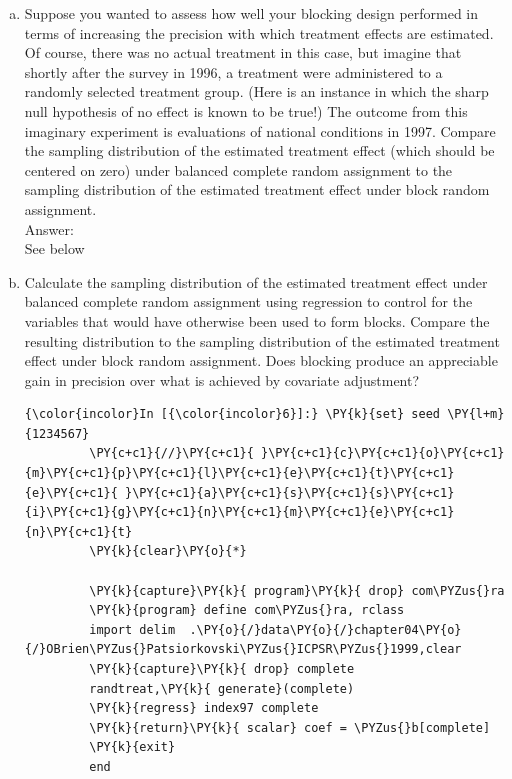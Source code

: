 \documentclass[11pt,notitlepage]{article}\usepackage[]{graphicx}\usepackage[]{color}
\makeatletter
\newenvironment{kframe}{%
 \def\at@end@of@kframe{}%
 \ifinner\ifhmode%
  \def\at@end@of@kframe{\end{minipage}}%
  \begin{minipage}{\columnwidth}%
 \fi\fi%
 \def\FrameCommand##1{\hskip\@totalleftmargin \hskip-\fboxsep
 \colorbox{shadecolor}{##1}\hskip-\fboxsep
     \hskip-\linewidth \hskip-\@totalleftmargin \hskip\columnwidth}%
 \MakeFramed {\advance\hsize-\width
   \@totalleftmargin\z@ \linewidth\hsize
   \@setminipage}}%
 {\par\unskip\endMakeFramed%
 \at@end@of@kframe}
\newenvironment{knitrout}{}{} %
\makeatother
\begin{document}
\begin{enumerate}[a)]
\item Suppose you wanted to assess how well your blocking design performed in terms of increasing the precision with which treatment effects are estimated. Of course, there was no actual treatment in this case, but imagine that shortly after the survey in 1996, a treatment were administered to a randomly selected treatment group. (Here is an instance in which the sharp null hypothesis of no effect is known to be true!) The outcome from this imaginary experiment is evaluations of national conditions in 1997. Compare the sampling distribution of the estimated treatment effect (which should be centered on zero) under balanced complete random assignment to the sampling distribution of the estimated treatment effect under block random assignment.\\
Answer:\\
See below

\item Calculate the sampling distribution of the estimated treatment effect under balanced complete random assignment using regression to control for the variables that would have otherwise been used to form blocks. Compare the resulting distribution to the sampling distribution of the estimated treatment effect under block random assignment.  Does blocking produce an appreciable gain in precision over what is achieved by covariate adjustment?  

\begin{knitrout}
\color{fgcolor}\begin{kframe}
    \begin{Verbatim}[commandchars=\\\{\}]
{\color{incolor}In [{\color{incolor}6}]:} \PY{k}{set} seed \PY{l+m}{1234567}
         \PY{c+c1}{//}\PY{c+c1}{ }\PY{c+c1}{c}\PY{c+c1}{o}\PY{c+c1}{m}\PY{c+c1}{p}\PY{c+c1}{l}\PY{c+c1}{e}\PY{c+c1}{t}\PY{c+c1}{e}\PY{c+c1}{ }\PY{c+c1}{a}\PY{c+c1}{s}\PY{c+c1}{s}\PY{c+c1}{i}\PY{c+c1}{g}\PY{c+c1}{n}\PY{c+c1}{m}\PY{c+c1}{e}\PY{c+c1}{n}\PY{c+c1}{t}
         \PY{k}{clear}\PY{o}{*}
         
         \PY{k}{capture}\PY{k}{ program}\PY{k}{ drop} com\PYZus{}ra
         \PY{k}{program} define com\PYZus{}ra, rclass
         import delim  .\PY{o}{/}data\PY{o}{/}chapter04\PY{o}{/}OBrien\PYZus{}Patsiorkovski\PYZus{}ICPSR\PYZus{}1999,clear
         \PY{k}{capture}\PY{k}{ drop} complete
         randtreat,\PY{k}{ generate}(complete)
         \PY{k}{regress} index97 complete
         \PY{k}{return}\PY{k}{ scalar} coef = \PYZus{}b[complete]
         \PY{k}{exit}
         end
         

\end{Verbatim}
\end{kframe}
\end{knitrout}
\end{enumerate}
\end{document}
